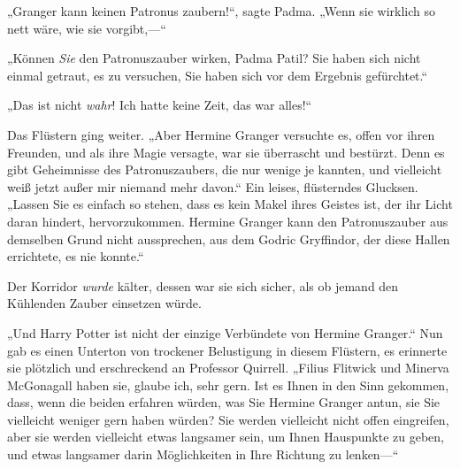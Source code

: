 „Granger kann keinen Patronus zaubern!“, sagte Padma. „Wenn sie wirklich so nett wäre, wie sie vorgibt,—“

„Können \emph{Sie} den Patronuszauber wirken, Padma Patil? Sie haben sich nicht einmal getraut, es zu versuchen, Sie haben sich vor dem Ergebnis gefürchtet.“

„Das ist nicht \emph{wahr}! Ich hatte keine Zeit, das war alles!“

Das Flüstern ging weiter. „Aber Hermine Granger versuchte es, offen vor ihren Freunden, und als ihre Magie versagte, war sie überrascht und bestürzt. Denn es gibt Geheimnisse des Patronuszaubers, die nur wenige je kannten, und vielleicht weiß jetzt außer mir niemand mehr davon.“ Ein leises, flüsterndes Glucksen. „Lassen Sie es einfach so stehen, dass es kein Makel ihres Geistes ist, der ihr Licht daran hindert, hervorzukommen. Hermine Granger kann den Patronuszauber aus demselben Grund nicht aussprechen, aus dem Godric Gryffindor, der diese Hallen errichtete, es nie konnte.“

Der Korridor \emph{wurde} kälter, dessen war sie sich sicher, als ob jemand den Kühlenden Zauber einsetzen würde.

„Und Harry Potter ist nicht der einzige Verbündete von Hermine Granger.“ Nun gab es einen Unterton von trockener Belustigung in diesem Flüstern, es erinnerte sie plötzlich und erschreckend an Professor Quirrell. „Filius Flitwick und Minerva McGonagall haben sie, glaube ich, sehr gern. Ist es Ihnen in den Sinn gekommen, dass, wenn die beiden erfahren würden, was Sie Hermine Granger antun, sie Sie vielleicht weniger gern haben würden? Sie werden vielleicht nicht offen eingreifen, aber sie werden vielleicht etwas langsamer sein, um Ihnen Hauspunkte zu geben, und etwas langsamer darin Möglichkeiten in Ihre Richtung zu lenken—“

